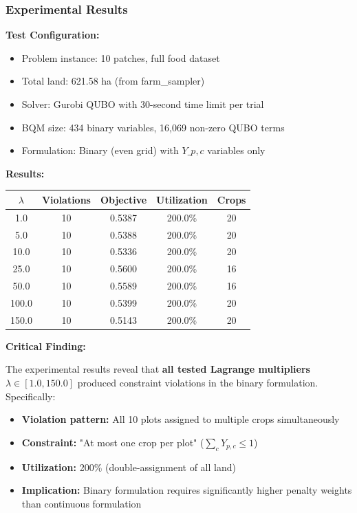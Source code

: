 \documentclass{oqireport}
\begin{document}
\subsubsection{Experimental Results}

\textbf{Test Configuration:}
\begin{itemize}
    \item Problem instance: 10 patches, full food dataset
    \item Total land: 621.58 ha (from farm\_sampler)
    \item Solver: Gurobi QUBO with 30-second time limit per trial
    \item BQM size: 434 binary variables, 16,069 non-zero QUBO terms
    \item Formulation: Binary (even grid) with $Y\_{p,c}$ variables only
\end{itemize}

\textbf{Results:}

\begin{center}
\begin{tabular}{ccccc}
\hline
$\lambda$ & Violations & Objective & Utilization & Crops \\
\hline
1.0 & 10 & 0.5387 & 200.0\% & 20 \\
5.0 & 10 & 0.5388 & 200.0\% & 20 \\
10.0 & 10 & 0.5336 & 200.0\% & 20 \\
25.0 & 10 & 0.5600 & 200.0\% & 16 \\
50.0 & 10 & 0.5589 & 200.0\% & 16 \\
100.0 & 10 & 0.5399 & 200.0\% & 20 \\
150.0 & 10 & 0.5143 & 200.0\% & 20 \\
\hline
\end{tabular}
\end{center}

\textbf{Critical Finding:}

The experimental results reveal that \textbf{all tested Lagrange multipliers} $\lambda \in [1.0, 150.0]$ produced constraint violations in the binary formulation. Specifically:

\begin{itemize}
    \item \textbf{Violation pattern:} All 10 plots assigned to multiple crops simultaneously
    \item \textbf{Constraint:} "At most one crop per plot" ($\sum_c Y_{p,c} \leq 1$)
    \item \textbf{Utilization:} 200\% (double-assignment of all land)
    \item \textbf{Implication:} Binary formulation requires significantly higher penalty weights than continuous formulation
\end{itemize}
\end{document}
